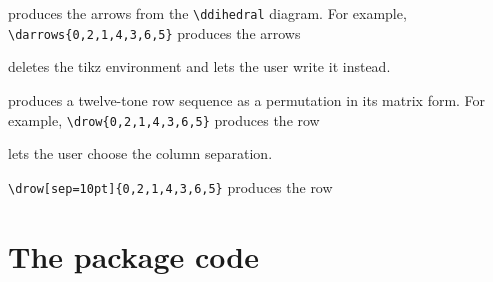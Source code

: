 \documentclass{article}
\begin{document}
\begin{itemize}
		 produces the arrows from the \verb|\ddihedral| diagram. For example,
 		\verb|\darrows{0,2,1,4,3,6,5}| produces the arrows\\
 		
 		\begin{itemize}
 			 deletes the tikz environment and lets the user write it instead.
 		\end{itemize}
		
		 produces a twelve-tone row sequence as a permutation in its matrix form. For example, \verb|\drow{0,2,1,4,3,6,5}| produces the row
		
		\drow{0,2,1,4,3,6,5}
		
		\begin{itemize}
			 lets the user choose the column separation.
		\end{itemize}
		
		\verb|\drow[sep=10pt]{0,2,1,4,3,6,5}| produces the row
		
		\drow[sep=10pt]{0,2,1,4,3,6,5}
		
	\end{itemize}
	
	\section{The package code}	
	\lstset{
		language=[Latex]Tex,
		basicstyle=\footnotesize\sffamily,
		keywordstyle=\footnotesize\sffamily,
		identifierstyle=\footnotesize\sffamily,
		commentstyle=\footnotesize\sffamily,
		stringstyle=\footnotesize\sffamily,
		escapechar=¬,
		numberstyle=\footnotesize\sffamily,%
		numbers=left,
		stepnumber=2,
		numbersep=15pt,
		columns=flexible,
		showstringspaces=false,
		tabsize=4,
	}
	
	
\end{document}
